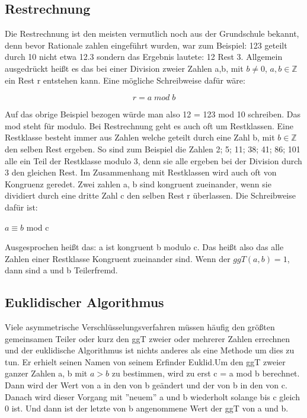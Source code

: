 \documentclass[a4paper,12pt,titlepage]{article}
\begin{document}
\subsection{Restrechnung}
Die Restrechnung ist den meisten vermutlich noch aus der Grundschule bekannt, denn bevor Rationale zahlen eingeführt wurden, war zum Beispiel: 123 geteilt durch 10 nicht etwa 12.3 sondern das Ergebnis lautete: 12 Rest 3. Allgemein ausgedrückt heißt es das bei einer Division zweier Zahlen a,b, mit $b \neq 0$, $a,b \in \mathbb{Z}$ ein Rest r entstehen kann. Eine mögliche Schreibweise dafür wäre: \newline
\begin{center}
\[r = a \; mod \; b\]
\end{center}
Auf das obrige Beispiel bezogen würde man also 12 = 123 mod 10 schreiben. Das mod steht für modulo. \newline Bei Restrechnung geht es auch oft um Restklassen. Eine Restklasse besteht immer aus Zahlen welche geteilt durch eine Zahl b, mit $b \in \mathbb{Z}$ den selben Rest ergeben. So sind zum Beispiel die Zahlen 2; 5; 11; 38; 41; 86; 101 alle ein Teil der Restklasse modulo 3, denn sie alle ergeben bei der Division durch 3 den gleichen Rest. Im Zusammenhang mit Restklassen wird auch oft von Kongruenz geredet. Zwei zahlen a, b sind kongruent zueinander, wenn sie dividiert durch eine dritte Zahl c den selben Rest r überlassen. Die Schreibweise dafür ist: \newline
 \begin{center}
$a \equiv b$ mod c
 \end{center}
Ausgesprochen heißt das: a ist kongruent b modulo c. 
Das heißt also das alle Zahlen einer Restklasse Kongruent zueinander sind.
Wenn der $ggT(a, b) = 1$, dann sind a und b Teilerfremd.
 
\subsection{Euklidischer Algorithmus}
Viele asymmetrische Verschlüsselungsverfahren müssen häufig den größten gemeinsamen Teiler oder kurz den ggT zweier oder mehrerer Zahlen errechnen und der euklidische Algorithmus ist nichts anderes als eine Methode um dies zu tun. Er erhielt seinen Namen von seinem Erfinder Euklid.\newline Um den ggT zweier ganzer Zahlen a, b mit $a > b$ zu bestimmen, wird zu erst c = a mod b berechnet. Dann wird der Wert von a in den von b geändert und der von b in den von c. Danach wird dieser Vorgang mit ''neuem'' a und b wiederholt solange bis c gleich 0 ist. Und dann ist der letzte von b angenommene Wert der ggT von a und b.
\end{document}

